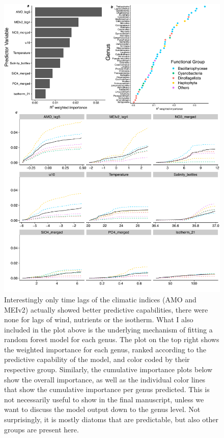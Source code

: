\documentclass[draft]{agujournal2019}
\begin{document}
\begin{figure}
\label{fig:GF}
\noindent\includegraphics[width=\textwidth]{fig/GF_output_plot3.pdf}
\caption{Interestingly only time lags of the climatic indices (AMO and MEIv2) actually showed better predictive capabilities, there were none for lags of wind, nutrients or the isotherm. What I also included in the plot above is the underlying mechanism of fitting a random forest model for each genus. The plot on the top right shows the weighted importance for each genus, ranked according to the predictive capability of the model, and color coded by their respective group. Similarly, the cumulative importance plots below show the overall importance, as well as the individual color lines that show the cumulative importance per genus predicted. This is not necessarily useful to show in the final manuscript, unless we want to discuss the model output down to the genus level. Not surprisingly, it is mostly diatoms that are predictable, but also other groups are present here.}
\end{figure}
\end{document}

